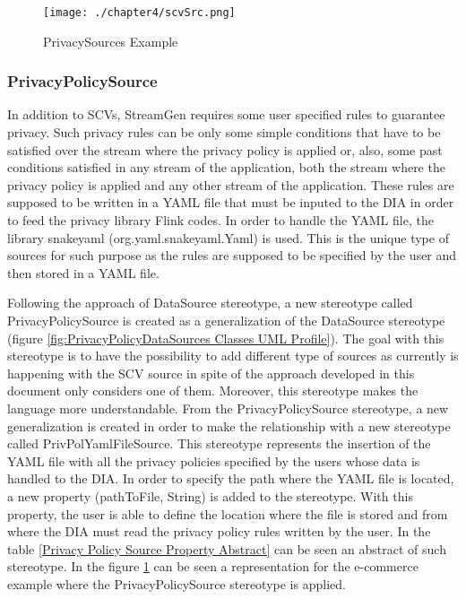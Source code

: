 \begin{figure}
\centering
{\texttt{[image: ./chapter4/scvSrc.png]}}
\caption{PrivacySources Example}
\label{fig:PrivacySources Example}
\end{figure}

\subsubsection{PrivacyPolicySource}

In addition to SCVs, StreamGen requires some user specified rules to guarantee privacy. Such privacy rules can be only some simple conditions that have to be satisfied over the stream where the privacy policy is applied or, also, some past conditions satisfied in any stream of the application, both the stream where the privacy policy is applied and any other stream of the application. These rules are supposed to be written in a YAML file that must be inputed to the DIA in order to feed the privacy library Flink codes. In order to handle the YAML file, the library snakeyaml (org.yaml.snakeyaml.Yaml) is used. This is the unique type of sources for such purpose as the rules are supposed to be specified by the user and then stored in a YAML file.

Following the approach of DataSource stereotype, a new stereotype called PrivacyPolicySource is created as a generalization of the DataSource stereotype (figure \ref{fig:PrivacyPolicyDataSources Classes UML Profile}). The goal with this stereotype is to have the possibility to add different type of sources as currently is happening with the SCV source in spite of the approach developed in this document only considers one of them. Moreover, this stereotype makes the language more understandable. From the PrivacyPolicySource stereotype, a new generalization is created in order to make the relationship with a new stereotype called PrivPolYamlFileSource. This stereotype represents the insertion of the YAML file with all the privacy policies specified by the users whose data is handled to the DIA. In order to specify the path where the YAML file is located, a new property (pathToFile, String) is added to the stereotype. With this property, the user is able to define the location where the file is stored and from where the DIA must read the privacy policy rules written by the user. In the table \ref{Privacy Policy Source Property Abstract} can be seen an abstract of such stereotype. In the figure \ref{fig:PrivacySources Example} can be seen a representation for the e-commerce example where the PrivacyPolicySource stereotype is applied.

